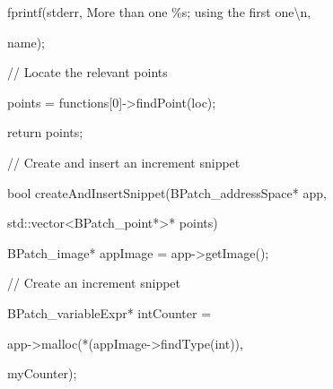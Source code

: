 {{{{{{fprintf(stderr, {\textquotedbl}More than one \%s; using the first one{\textbackslash}n{\textquotedbl},

name);}



{

}}





\bigskip



{

// Locate the relevant points}



{

points = functions[0]->findPoint(loc);}



{

return points;}



{

}}





\bigskip



{

// Create and insert an increment snippet}



{

bool createAndInsertSnippet(BPatch_addressSpace* app,}



{

std::vector<BPatch_point*>* points) {}



{

BPatch_image* appImage = app->getImage();}





\bigskip



{

// Create an increment snippet}



{

BPatch_variableExpr* intCounter =



{

app->malloc(*(appImage->findType({\textquotedbl}int{\textquotedbl})),

{\textquotedbl}myCounter{\textquotedbl});}



}}}}}
